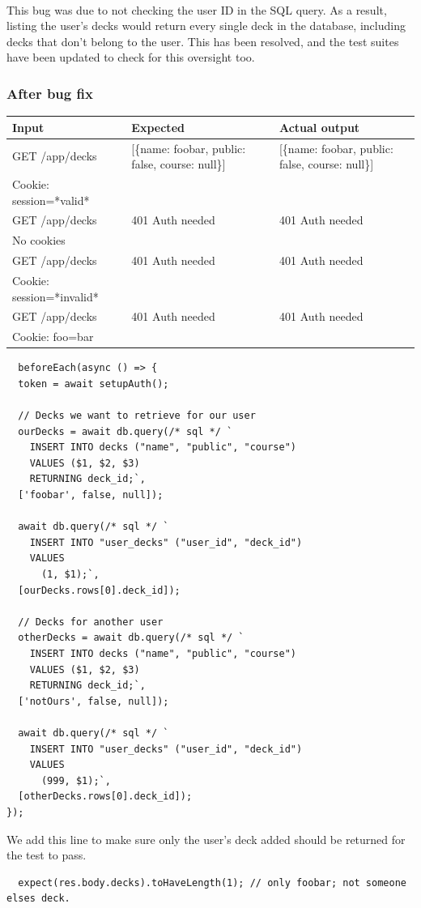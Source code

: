 \documentclass{report}
\begin{document}
\paragraph{}
This bug was due to not checking the user ID in the SQL query. As a result, listing the user's decks would return every single deck in the database, including decks that don't belong to the user. This has been resolved, and the test suites have been updated to check for this oversight too.

\subsubsection{After bug fix}
\begin{tabular}{|l|p{4cm}|p{4cm}|}
  \cline{1-3}
  Input & Expected & Actual output \\
  \hline \hline
  GET /app/decks & [\{name: foobar, public: false, course: null\}] & [\{name: foobar, public: false, course: null\}]  \\
  Cookie: session=*valid* && \\
  \hline \hline
  GET /app/decks & 401 Auth needed & 401 Auth needed \\
  No cookies && \\
  \hline \hline
  GET /app/decks & 401 Auth needed & 401 Auth needed \\
  Cookie: session=*invalid* && \\
  \hline \hline
  GET /app/decks & 401 Auth needed & 401 Auth needed \\
  Cookie: foo=bar && \\
  \hline
\end{tabular}

\begin{verbatim}
  beforeEach(async () => {
  token = await setupAuth();

  // Decks we want to retrieve for our user
  ourDecks = await db.query(/* sql */ `
    INSERT INTO decks ("name", "public", "course")
    VALUES ($1, $2, $3)
    RETURNING deck_id;`,
  ['foobar', false, null]);

  await db.query(/* sql */ `
    INSERT INTO "user_decks" ("user_id", "deck_id")
    VALUES 
      (1, $1);`,
  [ourDecks.rows[0].deck_id]);

  // Decks for another user
  otherDecks = await db.query(/* sql */ `
    INSERT INTO decks ("name", "public", "course")
    VALUES ($1, $2, $3)
    RETURNING deck_id;`,
  ['notOurs', false, null]);

  await db.query(/* sql */ `
    INSERT INTO "user_decks" ("user_id", "deck_id")
    VALUES 
      (999, $1);`,
  [otherDecks.rows[0].deck_id]);
});

\end{verbatim}
We add this line to make sure only the user's deck added should be returned for the test to pass.
\begin{verbatim}
  expect(res.body.decks).toHaveLength(1); // only foobar; not someone elses deck.
\end{verbatim}
\end{document}
